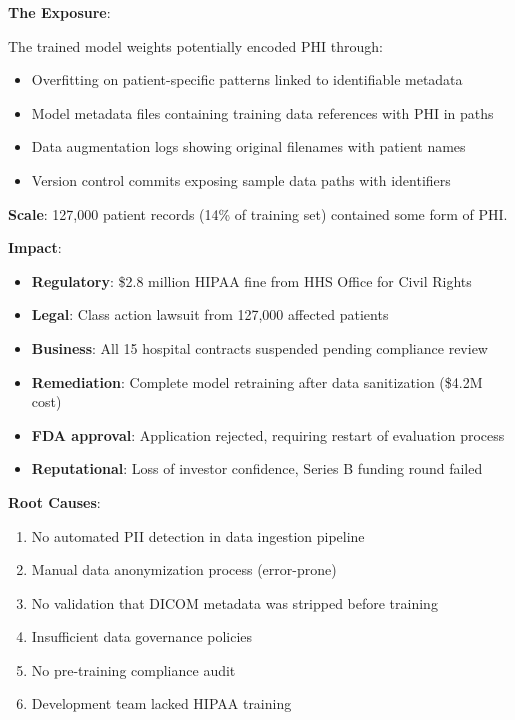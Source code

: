 \textbf{The Exposure}:

The trained model weights potentially encoded PHI through:
\begin{itemize}
    \item Overfitting on patient-specific patterns linked to identifiable metadata
    \item Model metadata files containing training data references with PHI in paths
    \item Data augmentation logs showing original filenames with patient names
    \item Version control commits exposing sample data paths with identifiers
\end{itemize}

\textbf{Scale}: 127,000 patient records (14\% of training set) contained some form of PHI.

\textbf{Impact}:
\begin{itemize}
    \item \textbf{Regulatory}: \$2.8 million HIPAA fine from HHS Office for Civil Rights
    \item \textbf{Legal}: Class action lawsuit from 127,000 affected patients
    \item \textbf{Business}: All 15 hospital contracts suspended pending compliance review
    \item \textbf{Remediation}: Complete model retraining after data sanitization (\$4.2M cost)
    \item \textbf{FDA approval}: Application rejected, requiring restart of evaluation process
    \item \textbf{Reputational}: Loss of investor confidence, Series B funding round failed
\end{itemize}

\textbf{Root Causes}:
\begin{enumerate}
    \item No automated PII detection in data ingestion pipeline
    \item Manual data anonymization process (error-prone)
    \item No validation that DICOM metadata was stripped before training
    \item Insufficient data governance policies
    \item No pre-training compliance audit
    \item Development team lacked HIPAA training
\end{enumerate}

